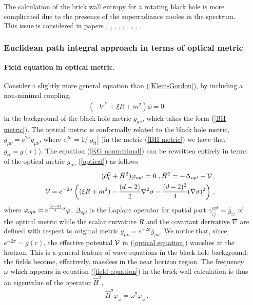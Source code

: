 \documentclass[12pt]{article}
\def\be{\begin{eqnarray}}
\def\ee{\end{eqnarray}}
\def\lb{\label}
\def\o{\over}
\begin{document}
The calculation of the brick wall entropy for a rotating black hole is more complicated due to the presence of the superradiance modes in the spectrum.
This issue is considered in papers \cite{Cognola:1997dv}, \cite{Frolov:1999gy}, \cite{Kim:2005pb}, \cite{ChangYoung:2008pw}, \cite{Jing:2001qh}, \cite{Wu:2003qc}, \cite{Ho:1998du}, \cite{Jing:1999vy}, \cite{Kenmoku:2005zh}.



                              
\subsubsection{ Euclidean path integral approach in terms of optical metric}
 
 \paragraph*{Field equation in optical metric.}
 Consider a slightly more general equation than (\ref{Klein-Gordon}), by including a non-minimal coupling,
 \be
 (-\nabla^2+\xi R +m^2)\phi=0\, 
 \lb{KG nonminimal}
 \ee
 in the background of the black hole metric $g_{\mu\nu}$, which takes the form (\ref{BH metric}). The optical metric is conformally related to the black hole metric,
 $\bar{g}_{\mu\nu}=e^{2\sigma}g_{\mu\nu}$, where $e^{2\sigma}=1/|g_{tt}|$ (in the metric (\ref{BH metric}) we have that $g_{tt}=g(r)$).
 The equation (\ref{KG nonminimal}) can be rewritten entirely in terms of   the optical metric  $\bar{g}_{\mu\nu}$ (\ref{optical})       as follows
 \be
 &&(\partial_t^2+\hat{H}^2)\varphi_{opt}=0 \, \, , 
 \hat{H}^2=-\Delta_{opt}+{\cal  V}\, , \nonumber \\
 && {\cal V}=  e^{-2\sigma}\left((\xi R+m^2)-{(d-2)\o 2}\nabla^2\sigma-{(d-2)^2\o 4}(\nabla\sigma)^2\right)\, ,
 \lb{optical equation}
 \ee  
 where $\varphi_{opt}=e^{{(d-2)\o 4}\sigma} \varphi$, $\Delta_{opt}$ is the Laplace operator for spatial part $\gamma^{opt}_{ij}=\bar{g}_{ij}$ of the optical metric while the scalar curvature $R$ and the covariant derivative $\nabla$ are defined with respect to original metric $g_{\mu\nu}=e^{-2\sigma}\bar{g}_{\mu\nu}$. We notice that, since $e^{-2\sigma}=g(r)$, the effective potential $\cal V$ in (\ref{optical equation}) vanishes at the horizon. This is a general feature of wave equations in the black hole background: the fields become, effectively, massless in the near horizon region.
  The frequency $\omega$ which appears in equation  (\ref{field equation}) in the brick wall calculation  is thus 
 an eigenvalue of the operator $\hat{H}^2$,
 \be
 \hat{H}^2\varphi_\omega=\omega^2\varphi_\omega\, .
 \lb{eigen function}
 \ee             
\end{document}
